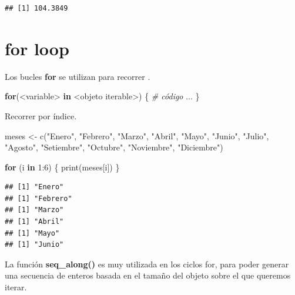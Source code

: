 \documentclass[
  12pt,
]{book}
\newenvironment{Shaded}{\begin{snugshade}}{\end{snugshade}}
\newcommand{\CommentTok}[1]{\textcolor[rgb]{0.56,0.35,0.01}{\textit{#1}}}
\newcommand{\ControlFlowTok}[1]{\textcolor[rgb]{0.13,0.29,0.53}{\textbf{#1}}}
\newcommand{\DecValTok}[1]{\textcolor[rgb]{0.00,0.00,0.81}{#1}}
\newcommand{\FunctionTok}[1]{\textcolor[rgb]{0.00,0.00,0.00}{#1}}
\newcommand{\NormalTok}[1]{#1}
\newcommand{\OtherTok}[1]{\textcolor[rgb]{0.56,0.35,0.01}{#1}}
\newcommand{\SpecialCharTok}[1]{\textcolor[rgb]{0.00,0.00,0.00}{#1}}
\newcommand{\StringTok}[1]{\textcolor[rgb]{0.31,0.60,0.02}{#1}}
\begin{document}
\begin{verbatim}
## [1] 104.3849
\end{verbatim}

\hypertarget{for-loop}{%
\section{\texorpdfstring{\textbf{for loop}}{for loop}}\label{for-loop}}

Los bucles \textbf{for} se utilizan para recorrer .

\begin{Shaded}
\begin{Highlighting}[]
\ControlFlowTok{for}\NormalTok{(}\SpecialCharTok{\textless{}}\NormalTok{variable}\SpecialCharTok{\textgreater{}} \ControlFlowTok{in} \SpecialCharTok{\textless{}}\NormalTok{objeto iterable}\SpecialCharTok{\textgreater{}}\NormalTok{) \{}
  \CommentTok{\# código}
\NormalTok{  ...}
\NormalTok{\}}
\end{Highlighting}
\end{Shaded}

Recorrer por índice.

\begin{Shaded}
\begin{Highlighting}[]
\NormalTok{meses }\OtherTok{\textless{}{-}} \FunctionTok{c}\NormalTok{(}\StringTok{"Enero"}\NormalTok{, }\StringTok{"Febrero"}\NormalTok{, }\StringTok{"Marzo"}\NormalTok{, }\StringTok{"Abril"}\NormalTok{, }\StringTok{"Mayo"}\NormalTok{, }\StringTok{"Junio"}\NormalTok{, }\StringTok{"Julio"}\NormalTok{, }\StringTok{"Agosto"}\NormalTok{, }\StringTok{"Setiembre"}\NormalTok{, }\StringTok{"Octubre"}\NormalTok{, }\StringTok{"Noviembre"}\NormalTok{, }\StringTok{"Diciembre"}\NormalTok{)}

\ControlFlowTok{for}\NormalTok{ (i }\ControlFlowTok{in} \DecValTok{1}\SpecialCharTok{:}\DecValTok{6}\NormalTok{) \{}
  \FunctionTok{print}\NormalTok{(meses[i])}
\NormalTok{\}}
\end{Highlighting}
\end{Shaded}

\begin{verbatim}
## [1] "Enero"
## [1] "Febrero"
## [1] "Marzo"
## [1] "Abril"
## [1] "Mayo"
## [1] "Junio"
\end{verbatim}

La función \textbf{seq\_along()} es muy utilizada en los ciclos for, para poder generar una secuencia de enteros basada en el tamaño del objeto sobre el que queremos iterar.
\end{document}
